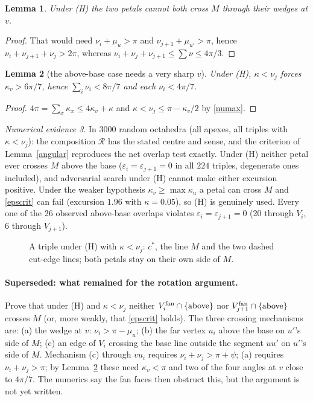 \documentclass[11pt]{article}
\newtheorem{lemma}{Lemma}
\theoremstyle{definition}
\theoremstyle{remark}
\newtheorem{numerics}[lemma]{Numerical evidence}
\newcommand{\R}{\mathcal{R}}
\begin{document}
\begin{lemma}\label{notboth}
Under (H) the two petals cannot both cross $M$ through their wedges at $v$.
\end{lemma}
\begin{proof}
That would need $\nu_i+\mu_u>\pi$ and $\nu_{j+1}+\mu_{u'}>\pi$, hence $\nu_i+\nu_{j+1}+\nu_j>2\pi$, whereas
$\nu_i+\nu_j+\nu_{j+1}\le\sum\nu\le 4\pi/3$.
\end{proof}

\begin{lemma}[the above-base case needs a very sharp $v$]\label{sharp}
Under (H), $\kappa<\nu_j$ forces $\kappa_v>6\pi/7$, hence $\sum_i\nu_i<8\pi/7$ and each $\nu_i<4\pi/7$.
\end{lemma}
\begin{proof}
$4\pi=\sum_x\kappa_x\le 4\kappa_v+\kappa$ and $\kappa<\nu_j\le\pi-\kappa_v/2$ by \eqref{numax}.
\end{proof}

\begin{numerics}
In $3000$ random octahedra (all apexes, all triples with $\kappa<\nu_j$): the composition $\R$ has the stated
centre and sense, and the criterion of Lemma~\ref{angular} reproduces the net overlap test exactly.
Under (H) neither petal ever crosses $M$ above the base ($\varepsilon_i=\varepsilon_{j+1}=0$ in all $224$
triples, degenerate ones included), and adversarial search under (H) cannot make either excursion positive.
Under the weaker hypothesis $\kappa_v\ge\max\kappa_u$ a petal can cross $M$ and \eqref{epscrit} can fail
(excursion $1.96$ with $\kappa=0.05$), so (H) is genuinely used. Every one of the 26 observed above-base
overlaps violates $\varepsilon_i=\varepsilon_{j+1}=0$ (20 through $V_i$, 6 through $V_{j+1}$).
\end{numerics}

\begin{figure}[h]\centering
\resizebox{0.9\linewidth}{!}{}
\caption{A triple under (H) with $\kappa<\nu_j$: $c^*$, the line $M$ and the two dashed cut-edge lines; both
petals stay on their own side of $M$.}
\end{figure}

\paragraph{Superseded: what remained for the rotation argument.}
Prove that under (H) and $\kappa<\nu_j$ neither $V_i^{\rm fan}\cap\{\text{above}\}$ nor
$V_{j+1}^{\rm fan}\cap\{\text{above}\}$ crosses $M$ (or, more weakly, that \eqref{epscrit} holds). The three
crossing mechanisms are: (a) the wedge at $v$: $\nu_i>\pi-\mu_u$; (b) the far vertex $u_i$ above the base on
$u'$'s side of $M$; (c) an edge of $V_i$ crossing the base line outside the segment $uu'$ on $u'$'s side of $M$.
Mechanism (c) through $vu_i$ requires $\nu_i+\nu_j>\pi+\psi$; (a) requires $\nu_i+\nu_j>\pi$; by
Lemma~\ref{sharp} these need $\kappa_v<\pi$ and two of the four angles at $v$ close to $4\pi/7$. The numerics
say the fan faces then obstruct this, but the argument is not yet written.
\end{document}
